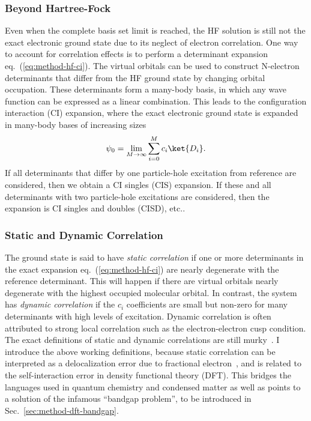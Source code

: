 \subsubsection{Beyond Hartree-Fock}
Even when the complete basis set limit is reached, the HF solution is still not the exact electronic ground state due to its neglect of electron correlation.
One way to account for correlation effects is to perform a determinant expansion eq.~(\ref{eq:method-hf-ci}).
The virtual orbitals can be used to construct N-electron determinants that differ from the HF ground state by changing orbital occupation.
These determinants form a many-body basis, in which any wave function can be expressed as a linear combination.
This leads to the configuration interaction (CI) expansion, where the exact electronic ground state is expanded in many-body bases of increasing sizes
\begin{align} \label{eq:method-hf-ci}
\psi_0 = \lim\limits_{M\rightarrow\infty}\sum\limits_{i=0}^{M} c_i \ket{D_i}.
\end{align}
If all determinants that differ by one particle-hole excitation from reference are considered, then we obtain a CI singles (CIS) expansion. If these and all determinants with two particle-hole excitations are considered, then the expansion is CI singles and doubles (CISD), etc..

\subsubsection{Static and Dynamic Correlation}
The ground state is said to have \textit{static correlation} if one or more determinants in the exact expansion eq.~(\ref{eq:method-hf-ci}) are nearly degenerate with the reference determinant.
This will happen if there are virtual orbitals nearly degenerate with the highest occupied molecular orbital.
In contrast, the system has \textit{dynamic correlation} if the $c_i$ coefficients are small but non-zero for many determinants with high levels of excitation.
Dynamic correlation is often attributed to strong local correlation such as the electron-electron cusp condition.
The exact definitions of static and dynamic correlations are still murky~\cite{Benavides-Riveros2017}.
I introduce the above working definitions, because static correlation can be interpreted as a delocalization error due to fractional electron~\cite{Cohen2008}, and is related to the self-interaction error in density functional theory (DFT).
This bridges the languages used in quantum chemistry and condensed matter as well as points to a solution of the infamous ``bandgap problem'', to be introduced in  Sec.~\ref{sec:method-dft-bandgap}.

